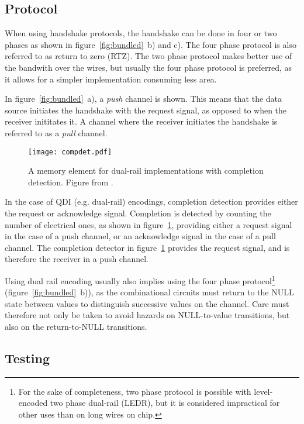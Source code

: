\subsection{Protocol}

When using handshake protocols, the handshake can be done in four or
two phases as shown in figure~\ref{fig:bundled}~b) and c). The four
phase protocol is also referred to as return to zero (RTZ). The two
phase protocol makes better use of the bandwith over the wires, but
usually the four phase protocol is preferred, as it allows for a
simpler implementation consuming less area.

In figure~\ref{fig:bundled}~a), a \emph{push} channel is shown. This
means that the data source initiates the handshake with the request
signal, as opposed to when the receiver inititates it. A channel where
the receiver initiates the handshake is referred to as a \emph{pull}
channel.

\begin{figure}[htbp]
  \centering
  \texttt{[image: compdet.pdf]}
  \caption{A memory element for dual-rail implementations with
    completion detection. Figure from \cite[pp. 21]{sparso}.}
  \label{fig:compdet}
\end{figure}

In the case of QDI (e.g. dual-rail) encodings, completion detection
provides either the request or acknowledge signal. Completion is
detected by counting the number of electrical ones, as shown in
figure~\ref{fig:compdet}, providing either a request signal in the
case of a push channel, or an acknowledge signal in the case of a pull
channel. The completion detector in figure~\ref{fig:compdet} provides
the request signal, and is therefore the receiver in a push channel.

Using dual rail encoding usually also implies using the four phase
protocol\footnote{For the sake of completeness, two phase protocol is
  possible with level-encoded two phase dual-rail (LEDR)\cite{ledr},
  but it is considered impractical for other uses than on long wires
  on chip.}  (figure~\ref{fig:bundled}~b)), as the combinational
circuits must return to the NULL state between values to distinguish
successive values on the channel. Care must therefore not only be
taken to avoid hazards on NULL-to-value transitions, but also on the
return-to-NULL transitions.


\subsection{Testing}


